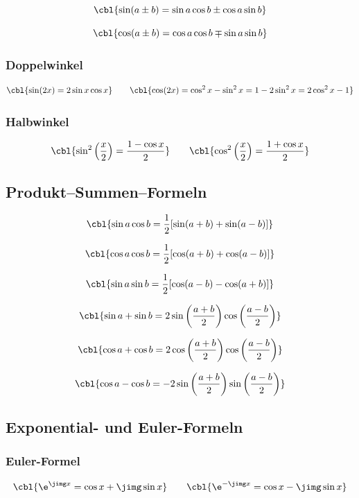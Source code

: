 \[
\cbl{\sin(a \pm b) = \sin a \cos b \pm \cos a \sin b}
\]

\[
\cbl{\cos(a \pm b) = \cos a \cos b \mp \sin a \sin b}
\]

\subsubsection{Doppelwinkel}

\[
\cbl{\sin(2x) = 2 \sin x \cos x}
\qquad
\cbl{\cos(2x) = \cos^2 x - \sin^2 x = 1 - 2 \sin^2 x = 2 \cos^2 x - 1}
\]

\subsubsection{Halbwinkel}

\[
\cbl{\sin^2\left(\frac{x}{2}\right) = \frac{1-\cos x}{2}}
\qquad
\cbl{\cos^2\left(\frac{x}{2}\right) = \frac{1+\cos x}{2}}
\]

\subsection{Produkt--Summen--Formeln}

\[
\cbl{\sin a \cos b = \frac{1}{2} [ \sin(a+b) + \sin(a-b) ]}
\]

\[
\cbl{\cos a \cos b = \frac{1}{2} [ \cos(a+b) + \cos(a-b) ]}
\]

\[
\cbl{\sin a \sin b = \frac{1}{2} [ \cos(a-b) - \cos(a+b) ]}
\]

\[
\cbl{\sin a + \sin b = 2 \sin\left(\frac{a+b}{2}\right) \cos\left(\frac{a-b}{2}\right)}
\]

\[
\cbl{\cos a + \cos b = 2 \cos\left(\frac{a+b}{2}\right) \cos\left(\frac{a-b}{2}\right)}
\]

\[
\cbl{\cos a - \cos b = -2 \sin\left(\frac{a+b}{2}\right) \sin\left(\frac{a-b}{2}\right)}
\]

\subsection{Exponential- und Euler-Formeln}

\subsubsection{Euler-Formel}

\[
\cbl{\e^{\jimg x} = \cos x + \jimg \sin x}
\qquad
\cbl{\e^{-\jimg x} = \cos x - \jimg \sin x}
\]


